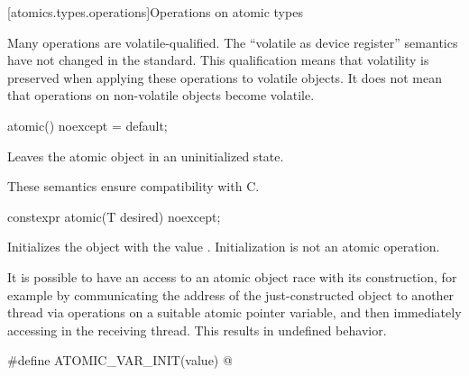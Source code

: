 [atomics.types.operations]{Operations on atomic types}

\pnum
\begin{note} Many operations are volatile-qualified. The ``volatile as device register''
semantics have not changed in the standard. This qualification means that volatility is
preserved when applying these operations to volatile objects. It does not mean that
operations on non-volatile objects become volatile. \end{note}

%
%
%
%
\begin{itemdecl}
atomic() noexcept = default;
\end{itemdecl}

\begin{itemdescr}
\pnum
\effects
Leaves the atomic object in an uninitialized state.
\begin{note}
These semantics ensure compatibility with C.
\end{note}
\end{itemdescr}

%
%
%
%
\begin{itemdecl}
constexpr atomic(T desired) noexcept;
\end{itemdecl}

\begin{itemdescr}
\pnum
\effects Initializes the object with the value .
Initialization is not an atomic operation.
\begin{note} It is possible to have an access to an atomic object 
race with its construction, for example by communicating the address of the
just-constructed object  to another thread via
 operations on a suitable atomic pointer
variable, and then immediately accessing  in the receiving thread.
This results in undefined behavior. \end{note}
\end{itemdescr}

%
\begin{itemdecl}
#define ATOMIC_VAR_INIT(value) @\seebelow@
\end{itemdecl}

